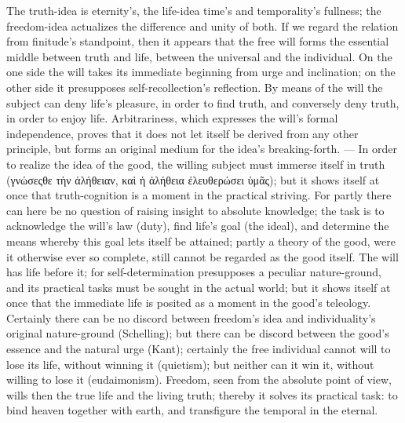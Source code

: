 \documentclass[12pt]{book}
\begin{document}
The truth-idea is eternity's, the life-idea time's and temporality's
fullness; the freedom-idea actualizes the difference and unity of both. If
we regard the relation from finitude's standpoint, then it appears that the
free will forms the essential middle between truth and life, between the
universal and the individual. On the one side the will takes its immediate
beginning from urge and inclination; on the other side it presupposes
self-recollection's reflection. By means of the will the subject can deny
life's pleasure, in order to find truth, and conversely deny truth, in order
to enjoy life. Arbitrariness, which expresses the will's formal
independence, proves that it does not let itself be derived from any other
principle, but forms an original medium for the idea's breaking-forth. ---
In order to realize the idea of the good, the willing subject must immerse
itself in truth (γνώσεςθε τὴν ἀλήθειαν, καὶ ἡ ἀλήθεια ἐλευθερώσει ὑμᾶς);
but it shows itself at once that truth-cognition is a moment in the
practical striving. For partly there can here be no question of raising
insight to absolute knowledge; the task is to acknowledge the will's law
(duty), find life's goal (the ideal), and determine the means whereby this
goal lets itself be attained; partly a theory of the good, were it otherwise
ever so complete, still cannot be regarded as the good itself. The will has
life before it; for self-determination presupposes a peculiar nature-ground,
and its practical tasks must be sought in the actual world; but it shows
itself at once that the immediate life is posited as a moment in the good's
teleology. Certainly there can be no discord between freedom's idea and
individuality's original nature-ground (Schelling); but there can be discord
between the good's essence and the natural urge (Kant); certainly the free
individual cannot will to lose its life, without winning it (quietism); but
neither can it win it, without willing to lose it (eudaimonism). Freedom,
seen from the absolute point of view, wills then the true life and the
living truth; thereby it solves its practical task: to bind heaven together
with earth, and transfigure the temporal in the eternal.
\end{document}
